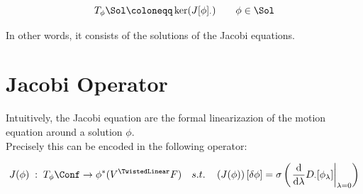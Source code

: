 \documentclass[a4paper,12pt]{scrartcl}  %
\begin{document}
	\begin{definition}\label{Def:TangentSol}
		\begin{displaymath}
			T_\phi \Sol \coloneqq \ker(J[\phi]_\cdot) \qquad \phi \in \Sol
		\end{displaymath}
	\end{definition}
In other words, it consists of the solutions of the Jacobi equations.

\section{Jacobi Operator}\label{Sec:JacobiOperator}
Intuitively, the Jacobi equation are the formal linearizazion of the motion equation around a solution $\phi$.\\
Precisely this can be encoded in the following operator:

	\begin{definition}\label{Def:JacobiOp}
		\begin{displaymath}
			J(\phi) \; : \; T_\phi \Conf \rightarrow	\phi^\ast(V^\TwistedLinear F) 
			\quad s.t. \quad  \left(J(\phi)\right) [ \delta\phi ]
			= \sigma \left( \left.\dfrac{\textrm{d}}{\textrm{d} \lambda} D_\cdot [\phi_\lambda]\right\rvert_{\lambda=0} \right)
		\end{displaymath}
	\end{definition}
\end{document}
